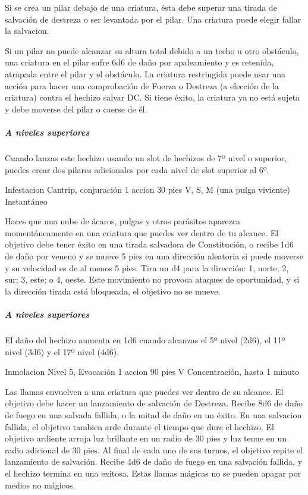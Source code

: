 \documentclass[a4paper,twocolumn,openany,10pt]{dndbook}
\begin{document}
	Si se crea un pilar debajo de una criatura, ésta debe superar una tirada de salvación de destreza o ser levantada por el
	pilar. Una criatura puede elegir fallar la salvacion.
	
	Si un pilar no puede alcanzar su altura total debido a un techo u otro obstáculo, una criatura en el pilar sufre 6d6 de daño
	por apaleamiento y es retenida, atrapada entre el pilar y el obstáculo. La criatura restringida puede usar una acción para
	hacer una comprobación de Fuerza o Destreza (a elección de la criatura) contra el hechizo salvar DC. Si tiene éxito, la
	criatura ya no está sujeta y debe moverse del pilar o caerse de él.

	\subparagraph{A niveles superiores} Cuando lanzas este hechizo usando un slot de hechizos de 7º nivel o superior, puedes
	crear dos pilares adicionales por cada nivel de slot superior al 6º. 

\spellheader%
	{Infestacion}
	{Cantrip, conjuración}
	{1 accion}
	{30 pies}
	{V, S, M (una pulga viviente)}
	{Instantáneo}
	
	Haces que una nube de ácaros, pulgas y otros parásitos aparezca momentáneamente en una criatura que puedes ver dentro de tu
	alcance. El objetivo debe tener éxito en una tirada salvadora de Constitución, o recibe 1d6 de daño por veneno y se mueve 5
	pies en una dirección aleatoria si puede moverse y su velocidad es de al menos 5 pies. Tira un d4 para la dirección: 1,
	norte; 2, sur; 3, este; o 4, oeste. Este movimiento no provoca ataques de oportunidad, y si la dirección tirada está
	bloqueada, el objetivo no se mueve.

	\subparagraph{A niveles superiores} El daño del hechizo aumenta en 1d6 cuando alcanzas el 5º nivel (2d6), el 11º nivel (3d6)
	y el 17º nivel (4d6). 

\spellheader%
	{Inmolacion}
	{Nivel 5, Evocación}
	{1 accion}
	{90 pies}
	{V}
	{Concentración, hasta 1 minuto}
	
	Las llamas envuelven a una criatura que puedes ver dentro de su alcance. El objetivo debe hacer un lanzamiento de salvación
	de Destreza. Recibe 8d6 de daño de fuego en una salvada fallida, o la mitad de daño en un éxito. En una salvacion fallida,
	el objetivo tambien arde durante el tiempo que dure el hechizo. El objetivo ardiente arroja luz brillante en un radio de 30
	pies y luz tenue en un radio adicional de 30 pies. Al final de cada uno de sus turnos, el objetivo repite el lanzamiento de
	salvación. Recibe 4d6 de daño de fuego en una salvación fallida, y el hechizo termina en una exitosa. Estas llamas mágicas
	no se pueden apagar por medios no mágicos.
	
\end{document}
